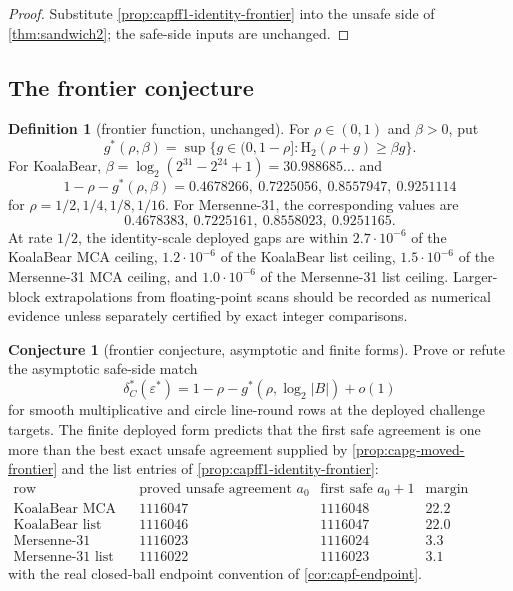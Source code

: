 \documentclass[11pt]{article}
\theoremstyle{definition}
\newtheorem{definition}[definition]{Definition}
\newtheorem{conjecture}[conjecture]{Conjecture}
\theoremstyle{remark}
\newcommand{\B}{B}
\newcommand{\Hb}{\mathrm{H}_2}
\begin{document}
\begin{proof}
Substitute \cref{prop:capff1-identity-frontier} into the unsafe side of \cref{thm:sandwich2}; the safe-side inputs are unchanged.
\end{proof}

\subsection{The frontier conjecture}

\begin{definition}[frontier function, unchanged]\label{def:capff1-gstar}
For $\rho\in(0,1)$ and $\beta>0$, put
\[
        g^*(\rho,\beta)=\sup\{g\in(0,1-\rho]:\Hb(\rho+g)\ge \beta g\}.
\]
For KoalaBear, $\beta=\log_2(2^{31}-2^{24}+1)=30.988685\ldots$ and
\[
1-\rho-g^*(\rho,\beta)=0.4678266,\ 0.7225056,\ 0.8557947,\ 0.9251114
\]
for $\rho=1/2,1/4,1/8,1/16$.  For Mersenne-31, the corresponding values are
\[
0.4678383,\ 0.7225161,\ 0.8558023,\ 0.9251165.
\]
At rate $1/2$, the identity-scale deployed gaps are within $2.7\cdot10^{-6}$ of the KoalaBear MCA ceiling, $1.2\cdot10^{-6}$ of the KoalaBear list ceiling, $1.5\cdot10^{-6}$ of the Mersenne-31 MCA ceiling, and $1.0\cdot10^{-6}$ of the Mersenne-31 list ceiling.  Larger-block extrapolations from floating-point scans should be recorded as numerical evidence unless separately certified by exact integer comparisons.
\end{definition}

\begin{conjecture}[frontier conjecture, asymptotic and finite forms]\label{prob:capff1-frontier}
Prove or refute the asymptotic safe-side match
\[
        \delta^*_C(\varepsilon^*)=1-\rho-g^*(\rho,\log_2|\B|)+o(1)
\]
for smooth multiplicative and circle line-round rows at the deployed challenge
targets.  The finite deployed form predicts that the first safe agreement is
one more than the best exact unsafe agreement supplied by
\cref{prop:capg-moved-frontier} and the list entries of
\cref{prop:capff1-identity-frontier}:
\[
\begin{array}{c|cc|c}
\text{row} & \text{proved unsafe agreement }a_0 &
\text{first safe }a_0+1 &
\text{margin (bits)}\\ \hline
\text{KoalaBear MCA} & 1116047 & 1116048 & 22.2\\
\text{KoalaBear list} & 1116046 & 1116047 & 22.0\\
\text{Mersenne-31 MCA} & 1116023 & 1116024 & 3.3\\
\text{Mersenne-31 list} & 1116022 & 1116023 & 3.1
\end{array}
\]
with the real closed-ball endpoint convention of \cref{cor:capf-endpoint}.
\end{conjecture}
\end{document}
